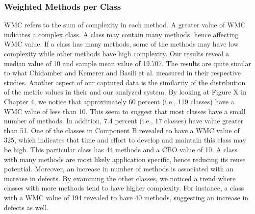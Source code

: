 


\subsubsection{Weighted Methods per Class}
WMC refers to the sum of complexity in each method. A greater value of WMC indicates a complex class. A class may contain many methods, hence affecting WMC value. If a class has many methods, some of the methods may have low complexity while other methods have high complexity.  Our results reveal a median value of 10 and sample mean value of 19.707. The results are quite similar to what Chidamber and Kemerer\cite{chidamber1994metrics} and Basili et al.\cite{basili1996validation} measured in their respective studies. Another aspect of our captured data is the similarity of the distribution of the metric values in their and our analyzed system. By looking at Figure X in Chapter 4, we notice that approximately 60 percent (i.e., 119 classes) have a WMC value of less than 10. This seem to suggest that most classes have a small number of methods. In addition, 7.4 percent (i.e., 17 classes) have value greater than 51. One of the classes in Component B revealed to have a WMC value of 325, which indicates that time and effort to develop and maintain this class may be high. This particular class has 44 methods and a CBO value of 10. A class with many methods are most likely application specific, hence reducing its reuse potential. Moreover, an increase in number of methods is associated with an increase in defects\cite{subramanyam2003empirical}. By examining the other classes, we noticed a trend where classes with more methods tend to have higher complexity. For instance, a class with a WMC value of 194 revealed to have 40 methods, suggesting an increase in defects as well.

